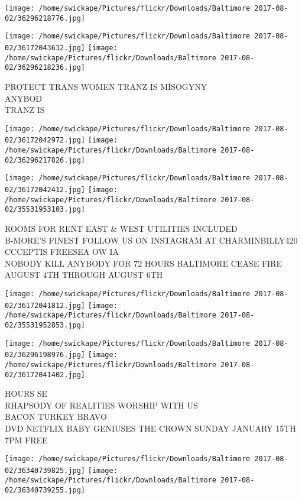 \documentclass[10pt,letterpaper]{article}
\begin{document}
\texttt{[image: /home/swickape/Pictures/flickr/Downloads/Baltimore 2017-08-02/36296218776.jpg]}

\vspace{0.25in}
\texttt{[image: /home/swickape/Pictures/flickr/Downloads/Baltimore 2017-08-02/36172043632.jpg]}
\texttt{[image: /home/swickape/Pictures/flickr/Downloads/Baltimore 2017-08-02/36296218236.jpg]}

PROTECT TRANS WOMEN TRANZ IS MISOGYNY\\
ANYBOD\\
TRANZ IS
\pagebreak

\texttt{[image: /home/swickape/Pictures/flickr/Downloads/Baltimore 2017-08-02/36172042972.jpg]}
\texttt{[image: /home/swickape/Pictures/flickr/Downloads/Baltimore 2017-08-02/36296217826.jpg]}

\texttt{[image: /home/swickape/Pictures/flickr/Downloads/Baltimore 2017-08-02/36172042412.jpg]}
\texttt{[image: /home/swickape/Pictures/flickr/Downloads/Baltimore 2017-08-02/35531953103.jpg]}

ROOMS FOR RENT EAST \& WEST UTILITIES INCLUDED\\
B{-}MORE'S FINEST FOLLOW US ON INSTAGRAM AT CHARMINBILLY420\\
CCCEPTIS FREESEA OW IA\\
NOBODY KILL ANYBODY FOR 72 HOURS BALTIMORE CEASE FIRE AUGUST 4TH THROUGH AUGUST 6TH
\pagebreak

\texttt{[image: /home/swickape/Pictures/flickr/Downloads/Baltimore 2017-08-02/36172041812.jpg]}
\texttt{[image: /home/swickape/Pictures/flickr/Downloads/Baltimore 2017-08-02/35531952853.jpg]}

\texttt{[image: /home/swickape/Pictures/flickr/Downloads/Baltimore 2017-08-02/36296198976.jpg]}
\texttt{[image: /home/swickape/Pictures/flickr/Downloads/Baltimore 2017-08-02/36172041402.jpg]}

HOURS SE\\
RHAPSODY OF REALITIES WORSHIP WITH US\\
BACON TURKEY BRAVO\\
DVD NETFLIX BABY GENIUSES THE CROWN SUNDAY JANUARY 15TH 7PM FREE
\pagebreak

\texttt{[image: /home/swickape/Pictures/flickr/Downloads/Baltimore 2017-08-02/36340739825.jpg]}
\texttt{[image: /home/swickape/Pictures/flickr/Downloads/Baltimore 2017-08-02/36340739255.jpg]}
\end{document}
